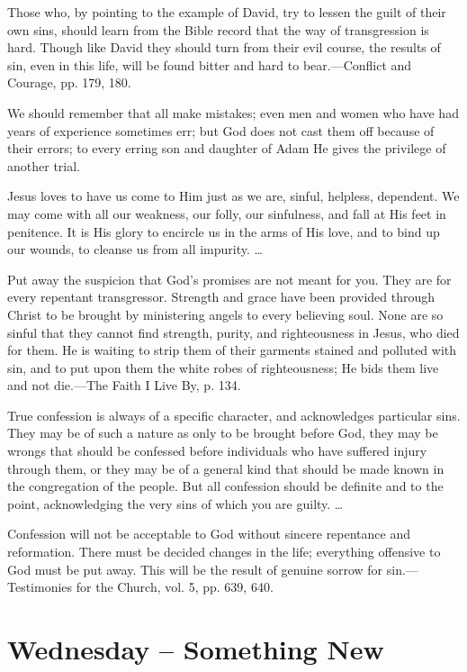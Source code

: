\documentclass[a4paper, 10pt, twoside, headings=small]{scrartcl}
\begin{document}
\begin{multicols}{2}
Those who, by pointing to the example of David, try to lessen the guilt of their own sins, should learn from the Bible record that the way of transgression is hard. Though like David they should turn from their evil course, the results of sin, even in this life, will be found bitter and hard to bear.—Conflict and Courage, pp. 179, 180.

We should remember that all make mistakes; even men and women who have had years of experience sometimes err; but God does not cast them off because of their errors; to every erring son and daughter of Adam He gives the privilege of another trial.

Jesus loves to have us come to Him just as we are, sinful, helpless, dependent. We may come with all our weakness, our folly, our sinfulness, and fall at His feet in penitence. It is His glory to encircle us in the arms of His love, and to bind up our wounds, to cleanse us from all impurity. …

Put away the suspicion that God’s promises are not meant for you. They are for every repentant transgressor. Strength and grace have been provided through Christ to be brought by ministering angels to every believing soul. None are so sinful that they cannot find strength, purity, and righteousness in Jesus, who died for them. He is waiting to strip them of their garments stained and polluted with sin, and to put upon them the white robes of righteousness; He bids them live and not die.—The Faith I Live By, p. 134.

True confession is always of a specific character, and acknowledges particular sins. They may be of such a nature as only to be brought before God, they may be wrongs that should be confessed before individuals who have suffered injury through them, or they may be of a general kind that should be made known in the congregation of the people. But all confession should be definite and to the point, acknowledging the very sins of which you are guilty. …

Confession will not be acceptable to God without sincere repentance and reformation. There must be decided changes in the life; everything offensive to God must be put away. This will be the result of genuine sorrow for sin.—Testimonies for the Church, vol. 5, pp. 639, 640.

\section*{Wednesday – Something New}


\end{multicols}
\end{document}
